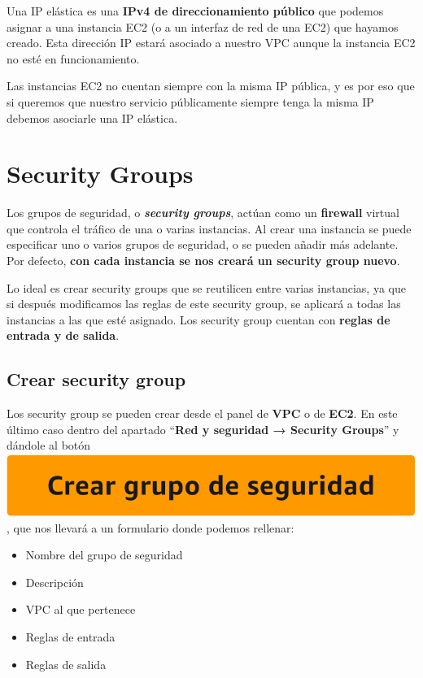 Una IP elástica es una \textbf{IPv4 de direccionamiento público} que podemos asignar a una instancia EC2 (o a un interfaz de red de una EC2) que hayamos creado. Esta dirección IP estará asociado a nuestro VPC aunque la instancia EC2 no esté en funcionamiento.


Las instancias EC2 no cuentan siempre con la misma IP pública, y es por eso que si queremos que nuestro servicio públicamente siempre tenga la misma IP debemos asociarle una IP elástica.


\chapter{Security Groups}

Los grupos de seguridad, o \textbf{\textit{security groups}}, actúan como un \textbf{firewall} virtual que controla el tráfico de una o varias instancias. Al crear una instancia se puede especificar uno o varios grupos de seguridad, o se pueden añadir más adelante. Por defecto, \textbf{con cada instancia se nos creará un security group nuevo}.

Lo ideal es crear security groups que se reutilicen entre varias instancias, ya que si después modificamos las reglas de este security group, se aplicará a todas las instancias a las que esté asignado. Los security group cuentan con \textbf{reglas de entrada y de salida}.

\section{Crear security group}

Los security group se pueden crear desde el panel de \textbf{VPC} o de \textbf{EC2}. En este último caso dentro del apartado “\textbf{Red y seguridad → Security Groups}” y dándole al botón \includegraphics[height=0.8\baselineskip]{img/aws/ec2_security_group_create.png}, que nos llevará a un formulario donde podemos rellenar:

\begin{itemize}
	\item Nombre del grupo de seguridad
	\item Descripción
	\item VPC al que pertenece
	\item Reglas de entrada
	\item Reglas de salida
\end{itemize}

